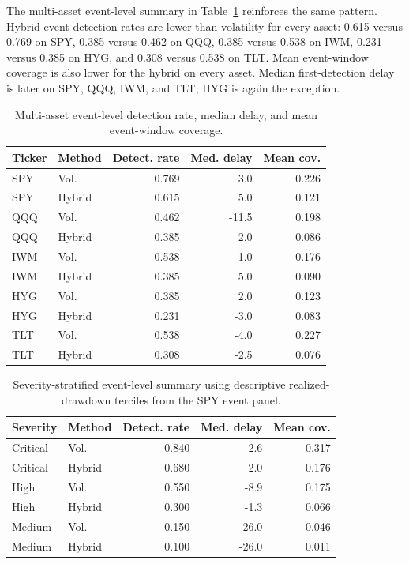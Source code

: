 \documentclass[pdflatex,sn-mathphys-num]{sn-jnl}
\begin{document}
The multi-asset event-level summary in Table~\ref{tab:multiasset_event_level} reinforces the same pattern. Hybrid event detection rates are lower than volatility for every asset: 0.615 versus 0.769 on SPY, 0.385 versus 0.462 on QQQ, 0.385 versus 0.538 on IWM, 0.231 versus 0.385 on HYG, and 0.308 versus 0.538 on TLT. Mean event-window coverage is also lower for the hybrid on every asset. Median first-detection delay is later on SPY, QQQ, IWM, and TLT; HYG is again the exception.

\begin{table}[t]
\centering
\caption{Multi-asset event-level detection rate, median delay, and mean event-window coverage.}
\label{tab:multiasset_event_level}
\scriptsize
\begin{tabular}{llrrr}
\toprule
Ticker & Method & Detect. rate & Med. delay & Mean cov.\\
\midrule
SPY & Vol. & 0.769 & 3.0 & 0.226\\
SPY & Hybrid & 0.615 & 5.0 & 0.121\\
QQQ & Vol. & 0.462 & -11.5 & 0.198\\
QQQ & Hybrid & 0.385 & 2.0 & 0.086\\
IWM & Vol. & 0.538 & 1.0 & 0.176\\
IWM & Hybrid & 0.385 & 5.0 & 0.090\\
HYG & Vol. & 0.385 & 2.0 & 0.123\\
HYG & Hybrid & 0.231 & -3.0 & 0.083\\
TLT & Vol. & 0.538 & -4.0 & 0.227\\
TLT & Hybrid & 0.308 & -2.5 & 0.076\\
\bottomrule
\end{tabular}
\end{table}

\begin{table}[t]
\centering
\caption{Severity-stratified event-level summary using descriptive realized-drawdown terciles from the SPY event panel.}
\label{tab:event_level_severity}
\scriptsize
\begin{tabular}{llrrr}
\toprule
Severity & Method & Detect. rate & Med. delay & Mean cov.\\
\midrule
Critical & Vol. & 0.840 & -2.6 & 0.317\\
Critical & Hybrid & 0.680 & 2.0 & 0.176\\
High & Vol. & 0.550 & -8.9 & 0.175\\
High & Hybrid & 0.300 & -1.3 & 0.066\\
Medium & Vol. & 0.150 & -26.0 & 0.046\\
Medium & Hybrid & 0.100 & -26.0 & 0.011\\
\bottomrule
\end{tabular}
\end{table}
\end{document}
